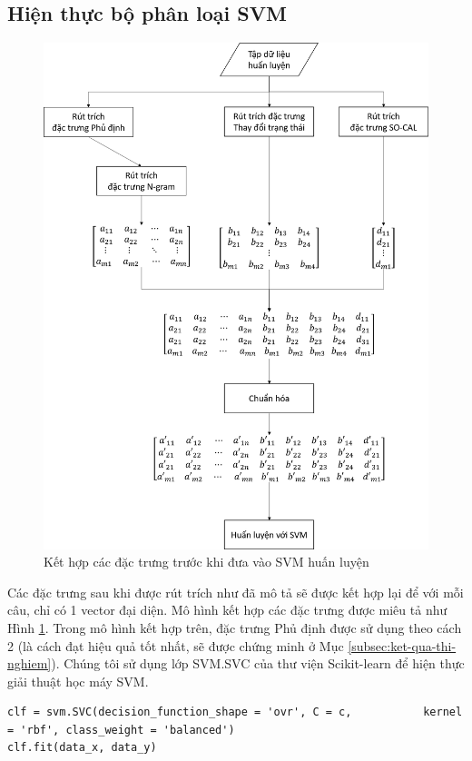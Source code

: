 \subsection{Hiện thực bộ phân loại SVM}
\begin{figure}[h]
\centering
\includegraphics[scale=0.25]{../hinh/kethopdactrung.png}
\caption{Kết hợp các đặc trưng trước khi đưa vào SVM huấn luyện} \label{fig:ket-hop-dac-trung}
\end{figure}
Các đặc trưng sau khi được rút trích như đã mô tả sẽ được kết hợp lại để với mỗi câu, chỉ có 1 vector đại diện. Mô hình kết hợp các đặc trưng được miêu tả như Hình \ref{fig:ket-hop-dac-trung}. Trong mô hình kết hợp trên, đặc trưng Phủ định được sử dụng theo cách 2 (là cách đạt hiệu quả tốt nhất, sẽ được chứng minh ở Mục \ref{subsec:ket-qua-thi-nghiem}). Chúng tôi sử dụng lớp SVM.SVC của thư viện Scikit-learn để hiện thực giải thuật học máy SVM.\\
\begin{minipage}{0.95\textwidth}
\begin{lstlisting}
clf = svm.SVC(decision_function_shape = 'ovr', C = c,           kernel = 'rbf', class_weight = 'balanced')
clf.fit(data_x, data_y)
\end{lstlisting}
\end{minipage}


